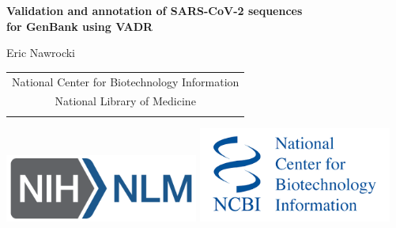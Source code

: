 \documentclass[landscape]{slides}
\begin{document}
\begin{slide}
\begin{center}
\large{\textbf{Validation and annotation of SARS-CoV-2 sequences \\ for GenBank using VADR}}

\normalsize

Eric Nawrocki \\

\medskip

\medskip

\medskip

\medskip

\medskip
\medskip

\small
\begin{tabular}{c}
National Center for Biotechnology Information\\
National Library of Medicine \\
\\
\end{tabular}

\vspace{0.1in}

\includegraphics[width=2.5in]{figs/NIH_NLM_ABRV_2C_4-white}
\includegraphics[width=2.5in]{figs/ncbi-logo}

\end{center}
\end{slide}
\end{document}
